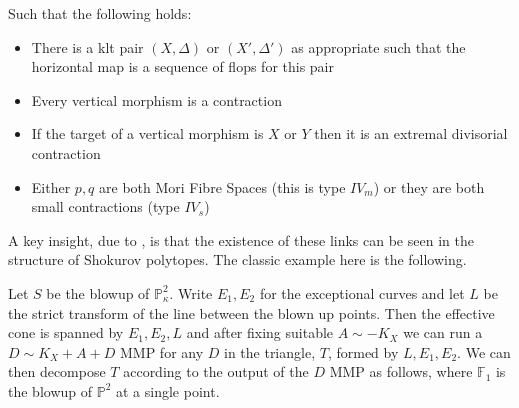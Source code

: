 \documentclass[a4paper,12pt]{book}
\begin{document}
	Such that the following holds:
	\begin{itemize}
		\item There is a klt pair $(X,\Delta)$ or $(X',\Delta')$ as appropriate such that the horizontal map is a sequence of flops for this pair
		\item Every vertical morphism is a contraction
		\item If the target of a vertical morphism is $X$ or $Y$ then it is an extremal divisorial contraction
		\item Either $p,q$ are both Mori Fibre Spaces (this is type $IV_{m}$) or they are both small contractions (type $IV_{s}$)
	\end{itemize}
	
	A key insight, due to \cite{hacon2009sarkisov}, is that the existence of these links can be seen in the structure of Shokurov polytopes. The classic example here is the following.
	
	Let $S$ be the blowup of $\mathbb{P}^{2}_{\kappa}$. Write $E_{1},E_{2}$ for the exceptional curves and let $L$ be the strict transform of the line between the blown up points. Then the effective cone is spanned by $E_{1},E_{2},L$ and after fixing suitable $A \sim -K_{X}$ we can run a $D \sim K_{X}+A+D$ MMP for any $D$ in the triangle, $T$, formed by $L,E_{1},E_{2}$. We can then decompose $T$ according to the output of the $D$ MMP as follows, where $\mathbb{F}_{1}$ is the blowup of $\mathbb{P}^{2}$ at a single point.
	 
\end{document}
